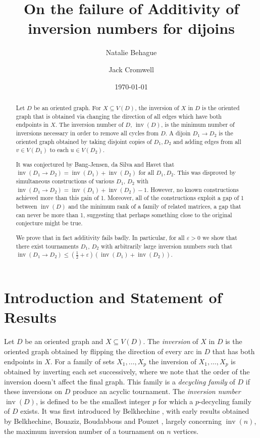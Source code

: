 \documentclass[a4paper, 12pt, reqno]{amsart}
\date{\today}
\title{On the failure of Additivity of inversion numbers for dijoins}
\author{Natalie Behague}
\author{Jack Cromwell}
\numberwithin{equation}{section}
\theoremstyle{plain}
\theoremstyle{remark}
\theoremstyle{definition}
\newcommand{\lb}{\left(}
\newcommand{\rb}{\right)}
\renewcommand{\epsilon}{\varepsilon}
\newcommand{\e}{\epsilon}
\newcommand{\inv}{\operatorname{inv}}
\begin{document}
 


 \begin{abstract}
     Let $D$ be an oriented graph. For $X \subseteq V(D)$, the inversion of $X$ in $D$ is the oriented graph that is obtained via changing the direction of all edges which have both endpoints in $X$. The inversion number of $D$, $\inv(D)$, is the minimum number of inversions necessary in order to remove all cycles from $D$. A dijoin $D_1 \to D_2$ is the oriented graph obtained by taking disjoint copies of $D_1,D_2$ and adding edges from all $v \in V(D_1)$ to each $u \in V(D_2)$.
     
     It was conjectured by  Bang-Jensen, da Silva and Havet that $\inv(D_1 \to D_2) = \inv(D_1) + \inv(D_2)$ for all $D_1, D_2$. This was disproved by simultaneous constructions of various $D_1$, $D_2$ with $\inv(D_1 \to D_2) = \inv(D_1)+\inv(D_2)-1$. However, no known constructions achieved more than this gain of 1. Moreover, all of the constructions exploit a gap of 1 between $\inv(D)$ and the minimum rank of a family of related matrices, a gap that can never be more than 1,  suggesting that perhaps something close to the original conjecture might be true.

     We prove that in fact additivity fails badly. In particular, for all $\e>0$ we show that there exist tournaments $D_1$, $D_2$ with arbitrarily large inversion numbers such that $\inv(D_1 \to D_2) \leq \lb\frac{1}{2} +\e\rb(\inv(D_1)+\inv(D_2))$.
 \end{abstract}

 \maketitle

 \section{Introduction and Statement of Results}

 Let $D$ be an oriented graph and $X \subseteq V(D)$. The \emph{inversion} of $X$ in $D$ is the oriented graph obtained by flipping the direction of every arc in $D$ that has both endpoints in $X$. For a family of sets $X_1,\dots,X_p$ the inversion of $X_1,\dots,X_p$ is obtained by inverting each set successively, where we note that the order of the inversion doesn't affect the final graph. This family is a \emph{decycling family} of $D$ if these inversions on $D$ produce an acyclic tournament. The \emph{inversion number} $\inv(D)$, is defined to be the smallest integer $p$ for which a $p$-decycling family of $D$ exists. It was first introduced by Belkhechine \cite{Bel}, with early results obtained by Belkhechine, Bouaziz, Boudabbous and Pouzet \cite{Belk}, largely concerning $\inv(n)$, the maximum inversion number of a tournament on $n$ vertices.
\end{document}
